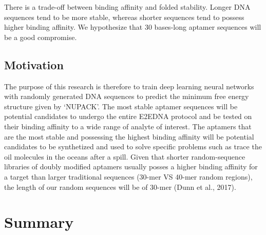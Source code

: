 \documentclass{article}
\begin{document}
There is a trade-off between binding affinity and folded stability. Longer DNA sequences tend to be more stable, whereas shorter sequences tend to possess higher binding affinity.
We hypothesize that 30 bases-long aptamer sequences will be a good compromise.


\subsection{Motivation}
The purpose of this research is therefore to train deep learning neural 
networks with randomly generated DNA sequences to predict the minimum 
free energy structure given by ‘NUPACK’.
The most stable aptamer sequences will be potential candidates to 
undergo the entire E2EDNA protocol and be tested on their binding 
affinity to a wide range of analyte of interest. The aptamers that 
are the most stable and possessing the highest binding affinity will 
be potential candidates to be synthetized and used to solve specific 
problems such as trace the oil molecules in the oceans after a spill. 
Given that shorter random-sequence libraries of doubly modified aptamers 
usually posses a higher binding affinity for a target than larger 
traditional sequences (30-mer VS 40-mer random regions), the length 
of our random sequences will be of 30-mer (Dunn et al., 2017). 
\section{Summary}
\end{document}
